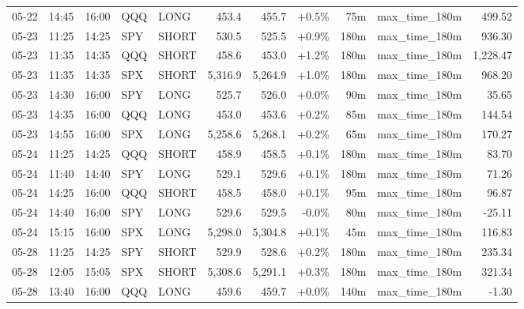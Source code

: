 \documentclass[11pt,a4paper,twoside]{article}
\begin{document}
\begin{center}
\begin{longtable}{>{\color{txtmain}}l l l l l r r r r >{\color{txtmain}}l r}
05-22 & 14:45 & 16:00 & QQQ & LONG & 453.4 & 455.7 & \textcolor{wingreen}{+0.5\%} & 75m & max\_time\_180m & \textcolor{wingreen}{499.52} \\
05-23 & 11:25 & 14:25 & SPY & SHORT & 530.5 & 525.5 & \textcolor{wingreen}{+0.9\%} & 180m & max\_time\_180m & \textcolor{wingreen}{936.30} \\
05-23 & 11:35 & 14:35 & QQQ & SHORT & 458.6 & 453.0 & \textcolor{wingreen}{+1.2\%} & 180m & max\_time\_180m & \textcolor{wingreen}{1,228.47} \\
05-23 & 11:35 & 14:35 & SPX & SHORT & 5,316.9 & 5,264.9 & \textcolor{wingreen}{+1.0\%} & 180m & max\_time\_180m & \textcolor{wingreen}{968.20} \\
05-23 & 14:30 & 16:00 & SPY & LONG & 525.7 & 526.0 & \textcolor{wingreen}{+0.0\%} & 90m & max\_time\_180m & \textcolor{wingreen}{35.65} \\
05-23 & 14:35 & 16:00 & QQQ & LONG & 453.0 & 453.6 & \textcolor{wingreen}{+0.2\%} & 85m & max\_time\_180m & \textcolor{wingreen}{144.54} \\
05-23 & 14:55 & 16:00 & SPX & LONG & 5,258.6 & 5,268.1 & \textcolor{wingreen}{+0.2\%} & 65m & max\_time\_180m & \textcolor{wingreen}{170.27} \\
05-24 & 11:25 & 14:25 & QQQ & SHORT & 458.9 & 458.5 & \textcolor{wingreen}{+0.1\%} & 180m & max\_time\_180m & \textcolor{wingreen}{83.70} \\
05-24 & 11:40 & 14:40 & SPY & LONG & 529.1 & 529.6 & \textcolor{wingreen}{+0.1\%} & 180m & max\_time\_180m & \textcolor{wingreen}{71.26} \\
05-24 & 14:25 & 16:00 & QQQ & SHORT & 458.5 & 458.0 & \textcolor{wingreen}{+0.1\%} & 95m & max\_time\_180m & \textcolor{wingreen}{96.87} \\
05-24 & 14:40 & 16:00 & SPY & LONG & 529.6 & 529.5 & \textcolor{lossred}{-0.0\%} & 80m & max\_time\_180m & \textcolor{lossred}{-25.11} \\
05-24 & 15:15 & 16:00 & SPX & LONG & 5,298.0 & 5,304.8 & \textcolor{wingreen}{+0.1\%} & 45m & max\_time\_180m & \textcolor{wingreen}{116.83} \\
05-28 & 11:25 & 14:25 & SPY & SHORT & 529.9 & 528.6 & \textcolor{wingreen}{+0.2\%} & 180m & max\_time\_180m & \textcolor{wingreen}{235.34} \\
05-28 & 12:05 & 15:05 & SPX & SHORT & 5,308.6 & 5,291.1 & \textcolor{wingreen}{+0.3\%} & 180m & max\_time\_180m & \textcolor{wingreen}{321.34} \\
05-28 & 13:40 & 16:00 & QQQ & LONG & 459.6 & 459.7 & \textcolor{wingreen}{+0.0\%} & 140m & max\_time\_180m & \textcolor{lossred}{-1.30} \\

\end{longtable}
\end{center}
\end{document}

